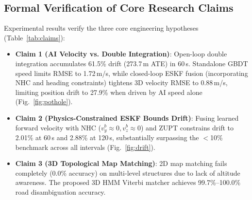 \documentclass[conference]{IEEEtran}
\begin{document}
\subsection{Formal Verification of Core Research Claims}

Experimental results verify the three core engineering hypotheses (Table~\ref{tab:claims}):
\begin{itemize}
\item \textbf{Claim 1 (AI Velocity vs. Double Integration)}: Open-loop double integration accumulates 61.5\% drift (273.7\,m ATE) in 60\,s. Standalone GBDT speed limits RMSE to 1.72\,m/s, while closed-loop ESKF fusion (incorporating NHC and heading constraints) tightens 3D velocity RMSE to 0.88\,m/s, limiting position drift to 27.9\% when driven by AI speed alone (Fig.~\ref{fig:pothole}).
\item \textbf{Claim 2 (Physics-Constrained ESKF Bounds Drift)}: Fusing learned forward velocity with NHC ($v_y^b \approx 0, v_z^b \approx 0$) and ZUPT constrains drift to 2.01\% at 60\,s and 2.88\% at 120\,s, substantially surpassing the $<$10\% benchmark across all intervals (Fig.~\ref{fig:drift}).
\item \textbf{Claim 3 (3D Topological Map Matching)}: 2D map matching fails completely (0.0\% accuracy) on multi-level structures due to lack of altitude awareness. The proposed 3D HMM Viterbi matcher achieves 99.7\%--100.0\% road disambiguation accuracy.
\end{itemize}

\begin{table}[h]
\centering
\caption{Formal Verification of Core Research Claims}
\label{tab:claims}
\small
\renewcommand{\arraystretch}{1.2}
\end{table}
\end{document}
